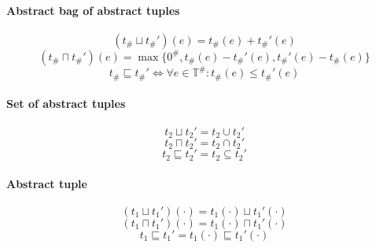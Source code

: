 \paragraph{Abstract bag of abstract tuples}

\begin{equation*}
    (t_\# \sqcup t_\#')(e) = t_\#(e) + t_\#'(e)
\end{equation*}
\begin{equation*}
    (t_\# \sqcap t_\#')(e) = \max\{0^\#, t_\#(e) - t_\#'(e), t_\#'(e) - t_\#(e)\}
\end{equation*}
\begin{equation*}
    t_\# \sqsubseteq t_\#' \iff \forall e \in \mathbb{T}^\# : t_\#(e) \leq t_\#'(e)
\end{equation*}

\paragraph{Set of abstract tuples}

\begin{equation*}
    t_2 \sqcup t_2' = t_2 \cup t_2'
\end{equation*}
\begin{equation*}
    t_2 \sqcap t_2' = t_2 \cap t_2'
\end{equation*}
\begin{equation*}
    t_2 \sqsubseteq t_2' = t_2 \subseteq t_2'
\end{equation*}

\paragraph{Abstract tuple}

\begin{equation*}
    (t_1 \sqcup t_1')(\cdot) = t_1(\cdot) \sqcup t_1'(\cdot)
\end{equation*}
\begin{equation*}
    (t_1 \sqcap t_1')(\cdot) = t_1(\cdot) \sqcap t_1'(\cdot)
\end{equation*}
\begin{equation*}
    t_1 \sqsubseteq t_1' = t_1(\cdot) \sqsubseteq t_1'(\cdot)
\end{equation*}


